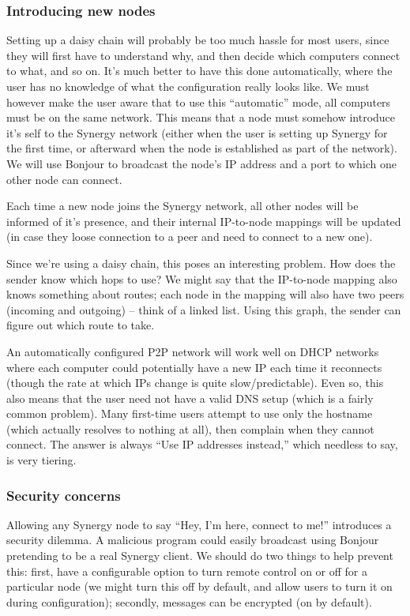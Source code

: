 \subsubsection{Introducing new nodes}

Setting up a daisy chain will probably be too much hassle for most users,
since they will first have to understand why, and then decide which computers
connect to what, and so on. It's much better to have this done automatically,
where the user has no knowledge of what the configuration really looks like.
We must however make the user aware that to use this ``automatic'' mode, all
computers must be on the same network. This means that a node must somehow
introduce it's self to the Synergy network (either when the user is setting 
up Synergy for the first time, or afterward when the node is established
as part of the network). We will use Bonjour to broadcast the node's IP address
and a port to which one other node can connect.

Each time a new node joins the Synergy network, all other nodes will be informed
of it's presence, and their internal IP-to-node mappings will be updated (in 
case they loose connection to a peer and need to connect to a new one).

Since we're using a daisy chain, this poses an interesting problem. How does
the sender know which hops to use? We might say that the IP-to-node mapping
also knows something about routes; each node in the mapping will also have two
peers (incoming and outgoing) -- think of a linked list. Using this graph,
the sender can figure out which route to take.

An automatically configured P2P network will work well on DHCP networks where
each computer could potentially have a new IP each time it reconnects (though
the rate at which IPs change is quite slow/predictable). Even so, this also 
means that the user need not have a valid DNS setup (which is a fairly common
problem). Many first-time users attempt to use only the hostname (which actually
resolves to nothing at all), then complain when they cannot connect. The answer
is always ``Use IP addresses instead,'' which needless to say, is very tiering.

\subsubsection{Security concerns}

Allowing any Synergy node to say ``Hey, I'm here, connect to me!'' introduces
a security dilemma. A malicious program could easily broadcast using Bonjour
pretending to be a real Synergy client. We should do two things to help prevent
this: first, have a configurable option to turn remote control on or off for
a particular node (we might turn this off by default, and allow users to turn
it on during configuration); secondly, messages can be encrypted (on by 
default).

